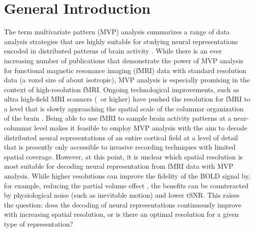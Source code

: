 
\chapter{General Introduction}
The term multivariate pattern (MVP) analysis summarizes a range of data
analysis strategies that are highly suitable for studying neural
representations encoded in distributed patterns of brain activity
\citep{haxby_2012}. While there is an ever increasing number of publications
that demonstrate the power of MVP analysis for functional magnetic resonance
imaging (fMRI) data \citep{opdebeeck_2010,freeman_2011,alink_2013,freeman_2013}
with standard resolution data (a voxel size of about  isotropic), MVP
analysis is especially promising in the context of high-resolution fMRI.
Ongoing technological improvements, such as ultra high-field MRI scanners
(\sevenT\ or higher) have pushed the resolution for fMRI to a level
that is slowly approaching the spatial scale of the columnar organization of
the brain \citep{yacoub_2008,heidemann_2012}. Being able to use fMRI to sample
brain activity patterns at a near-columnar level makes it feasible to employ
MVP analysis with the aim to decode distributed neural representations of an
entire cortical field at a level of detail that is presently only accessible to
invasive recording techniques with limited spatial coverage. However, at this
point, it is unclear which spatial resolution is most suitable for decoding
neural representation from fMRI data with MVP analysis. While higher
resolutions can improve the fidelity of the BOLD signal by, for example,
reducing the partial volume effect \citep{Weibull_2008}, the benefits can be
counteracted by physiological noise (such as inevitable motion) and lower tSNR. 
This raises the question: does the decoding of neural representations continuously improve
with increasing spatial resolution, or is there an optimal resolution for a
given type of representation?

